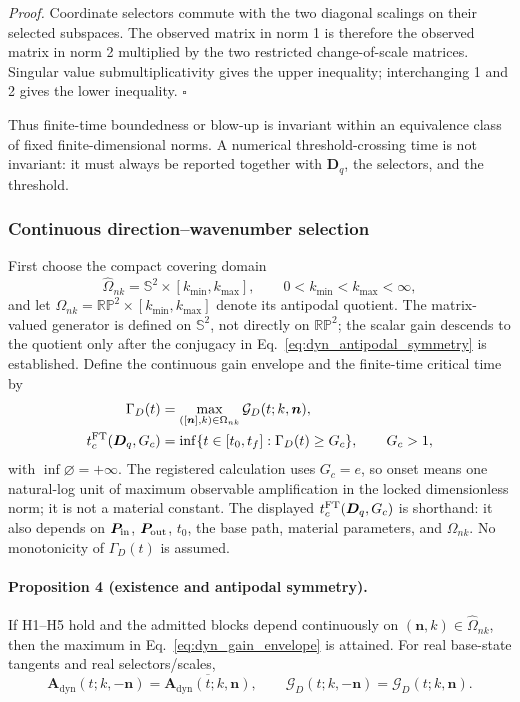 \emph{Proof.}
Coordinate selectors commute with the two diagonal scalings on their selected
subspaces.  The observed matrix in norm 1 is therefore the observed matrix in
norm 2 multiplied by the two restricted change-of-scale matrices.  Singular
value submultiplicativity gives the upper inequality; interchanging 1 and 2
gives the lower inequality. \hfill$\square$

Thus finite-time boundedness or blow-up is invariant within an equivalence
class of fixed finite-dimensional norms.  A numerical threshold-crossing time
is not invariant: it must always be reported together with
$\boldsymbol D_q$, the selectors, and the threshold.

\subsubsection{Continuous direction--wavenumber selection}

First choose the compact covering domain
\begin{equation}
 \widehat\Omega_{nk}=\mathbb S^2\times[k_{\min},k_{\max}],
 \qquad 0<k_{\min}<k_{\max}<\infty,
 \label{eq:dyn_covering_search_domain}
\end{equation}
and let
$\Omega_{nk}=\mathbb{RP}^2\times[k_{\min},k_{\max}]$ denote its antipodal
quotient.  The matrix-valued generator is defined on $\mathbb S^2$, not
directly on $\mathbb{RP}^2$; the scalar gain descends to the quotient only after
the conjugacy in Eq.~\eqref{eq:dyn_antipodal_symmetry} is established.  Define
the continuous gain envelope and the finite-time critical time by
\begin{align}
 \Gamma_D(t)
 &=\max_{([\boldsymbol n],k)\in\Omega_{nk}}
   \mathcal G_D(t;k,\boldsymbol n),
 \label{eq:dyn_gain_envelope}\\
 t_c^{\rm FT}(\boldsymbol D_q,G_c)
 &=\inf\{t\in[t_0,t_f]:\Gamma_D(t)\ge G_c\},
 \qquad G_c>1,
 \label{eq:dyn_finite_critical_time}
\end{align}
with $\inf\varnothing=+\infty$.  The registered calculation uses $G_c=e$, so
onset means one natural-log unit of maximum observable amplification in the
locked dimensionless norm; it is not a material constant.
The displayed $t_c^{\rm FT}(\boldsymbol D_q,G_c)$ is shorthand: it also depends
on $\boldsymbol P_{\rm in}$, $\boldsymbol P_{\rm out}$, $t_0$, the base path,
material parameters, and $\Omega_{nk}$.  No monotonicity of $\Gamma_D(t)$ is
assumed.

\paragraph{Proposition 4 (existence and antipodal symmetry).}
If H1--H5 hold and the admitted blocks depend continuously on
$(\boldsymbol n,k)\in\widehat\Omega_{nk}$, then the maximum in
Eq.~\eqref{eq:dyn_gain_envelope} is attained.  For real base-state tangents and
real selectors/scales,
\begin{equation}
 \boldsymbol A_{\mathrm{dyn}}(t;k,-\boldsymbol n)
 =\overline{\boldsymbol A_{\mathrm{dyn}}(t;k,\boldsymbol n)},
 \qquad
 \mathcal G_D(t;k,-\boldsymbol n)
 =\mathcal G_D(t;k,\boldsymbol n).
 \label{eq:dyn_antipodal_symmetry}
\end{equation}


